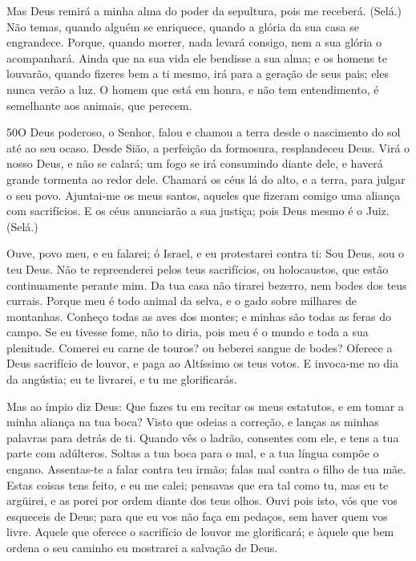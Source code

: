 Mas Deus remirá a minha alma do poder da sepultura, pois me
receberá. (Selá.) Não temas, quando alguém se enriquece,
quando a glória da sua casa se engrandece. Porque, quando
morrer, nada levará consigo, nem a sua glória o acompanhará.
Ainda que na sua vida ele bendisse a sua alma; e os homens te
louvarão, quando fizeres bem a ti mesmo, irá para a geração
de seus pais; eles nunca verão a luz. O homem que está em
honra, e não tem entendimento, é semelhante aos animais, que
perecem.

\bigskip

\lettrine{50}{}O Deus poderoso, o Senhor, falou e chamou a
terra desde o nascimento do sol até ao seu ocaso. Desde Sião, a
perfeição da formosura, resplandeceu Deus. Virá o nosso Deus, e
não se calará; um fogo se irá consumindo diante dele, e haverá
grande tormenta ao redor dele. Chamará os céus lá do alto, e a
terra, para julgar o seu povo. Ajuntai-me os meus santos,
aqueles que fizeram comigo uma aliança com sacrifícios. E os
céus anunciarão a sua justiça; pois Deus mesmo é o Juiz. (Selá.)

Ouve, povo meu, e eu falarei; ó Israel, e eu protestarei contra
ti: Sou Deus, sou o teu Deus. Não te repreenderei pelos teus
sacrifícios, ou holocaustos, que estão continuamente perante mim.
Da tua casa não tirarei bezerro, nem bodes dos teus currais.
Porque meu é todo animal da selva, e o gado sobre milhares de
montanhas. Conheço todas as aves dos montes; e minhas são
todas as feras do campo. Se eu tivesse fome, não to diria,
pois meu é o mundo e toda a sua plenitude. Comerei eu carne
de touros? ou beberei sangue de bodes? Oferece a Deus
sacrifício de louvor, e paga ao Altíssimo os teus votos. E
invoca-me no dia da angústia; eu te livrarei, e tu me glorificarás.

Mas ao ímpio diz Deus: Que fazes tu em recitar os meus estatutos,
e em tomar a minha aliança na tua boca? Visto que odeias a
correção, e lanças as minhas palavras para detrás de ti.
Quando vês o ladrão, consentes com ele, e tens a tua parte
com adúlteros. Soltas a tua boca para o mal, e a tua língua
compõe o engano. Assentas-te a falar contra teu irmão; falas
mal contra o filho de tua mãe. Estas coisas tens feito, e eu
me calei; pensavas que era tal como tu, mas eu te argüirei, e as
porei por ordem diante dos teus olhos. Ouvi pois isto, vós
que vos esqueceis de Deus; para que eu vos não faça em pedaços, sem
haver quem vos livre. Aquele que oferece o sacrifício de
louvor me glorificará; e àquele que bem ordena o seu caminho eu
mostrarei a salvação de Deus.

